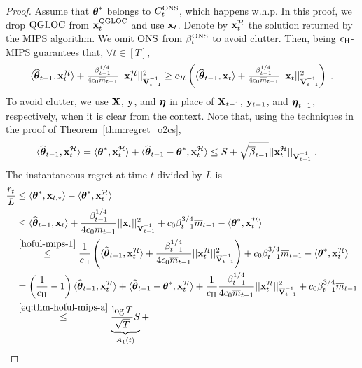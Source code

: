 \begin{proof}
  Assume that ${{\boldsymbol \theta}}^*$ belongs to $C^{{\text{\normalfont ONS}}}_t$, which happens w.h.p.
  In this proof, we drop ${\text{\normalfont QGLOC}}$ from $\mathbf{x}_t^{{\text{\normalfont QGLOC}}}$ and use $\mathbf{x}_t$.
  Denote by $\mathbf{x}_t^{\mathcal{H}}$ the solution returned by the MIPS algorithm.
  We omit ${\text{\normalfont ONS}}$ from $\beta^{{\text{\normalfont ONS}}}_t$ to avoid clutter.
  Then, being $c_\text{\normalfont H}$-MIPS guarantees that, $\forall t \in [T]$,
\begin{equation}\begin{aligned} \label{hoful-mips-1} 
    \textstyle    {\langle} \widehat{\boldsymbol\theta}_{t-1}, \mathbf{x}_t^{\mathcal{H}} {\rangle} + { \frac{\beta_{t-1}^{1/4}}{4 c_0 \overline{m}_{t-1}} } { ||\mathbf{x}_t^{\mathcal{H}}||^2_{\overline{\mathbf{V}}^{-1}_{t-1}} }
  \ge c_\mathcal{H} \left( {\langle} \widehat{\boldsymbol\theta}_{t-1}, \mathbf{x}_t {\rangle} + { \frac{\beta_{t-1}^{1/4}}{4 c_0 \overline{m}_{t-1}} } { ||\mathbf{x}_t||^2_{\overline{\mathbf{V}}^{-1}_{t-1}} } \right) \;.
\end{aligned}\end{equation}
  To avoid clutter, we use $\mathbf{X}$, ${{\mathbf y}}$, and ${{\boldsymbol \eta}}$ in place of $\mathbf{X}_{t-1}$, ${{\mathbf y}}_{t-1}$, and ${{\boldsymbol \eta}}_{t-1} $, respectively, when it is clear from the context.
  Note that, using the techniques in the proof of Theorem~\ref{thm:regret_o2cs},
\begin{equation}\begin{aligned} \label{eq:thm-hoful-mips-a} 
    {\langle} \widehat{\boldsymbol\theta}_{t-1}, \mathbf{x}_t^{\mathcal{H}} {\rangle}  
    &= {\langle}{{\boldsymbol \theta}}^*,\mathbf{x}_t^{\mathcal{H}}{\rangle} + {\langle} {{\widehat{\boldsymbol \theta}}}_{t-1} - {{\boldsymbol \theta}}^*, \mathbf{x}_t^{\mathcal{H}} {\rangle} \le S + \sqrt{{\overline{\beta}}_{t-1}}||\mathbf{x}_t^\mathcal{H}||_{\overline{\mathbf{V}}^{-1}_{t-1}} \;.
\end{aligned}\end{equation}
%  
  The instantaneous regret at time $t$ divided by $L$ is
  \begin{align*}
    \fr{r_t}{L} 
  &\le \la \th^*, \x_{t,*} \ra - \la \th^*, \x_t^{\cH} \ra \\
  &\le \la \hatth_{t-1}, \x_t \ra + \fr{\beta_{t-1}^{1/4}}{4 c_0 \barm_{t-1}} { ||\x_t||^2_{\barV^{-1}_{t-1}} } + c_0 \beta_{t-1}^{3/4} \barm_{t-1}  - \la \th^*, \x_t^{\cH} \ra \\
  &\stackrel{\eqref{hoful-mips-1}}{\le} \fr{1}{\ccH} \lt( \la \hatth_{t-1}, \x^{\cH}_t \ra + \fr{\beta_{t-1}^{1/4}}{4 c_0 \barm_{t-1}} { ||\x^\cH_t||^2_{\barV^{-1}_{t-1}} } \rt) + c_0 \beta_{t-1}^{3/4} \barm_{t-1}  - \la \th^*, \x_t^{\cH} \ra \\
  &=  {\lt(\fr{1}{\ccH} - 1\rt) \la \hatth_{t-1}, \x_t^{\cH} \ra} + 
  {\la \hatth_{t-1} - \th^*, \x_t^{\cH} \ra + \fr{1}{\ccH}\fr{\beta_{t-1}^{1/4}}{4 c_0 \barm_{t-1}} { ||\x_t^{\cH}||^2_{\barV^{-1}_{t-1}} } + c_0 \beta_{t-1}^{3/4} \barm_{t-1} } \\
  &\stackrel{\eqref{eq:thm-hoful-mips-a}}{\le} \underbrace{\fr{\log T}{\sqrt{T}} S}_{A_1(t)} + 

\end{align*}
\end{proof}
